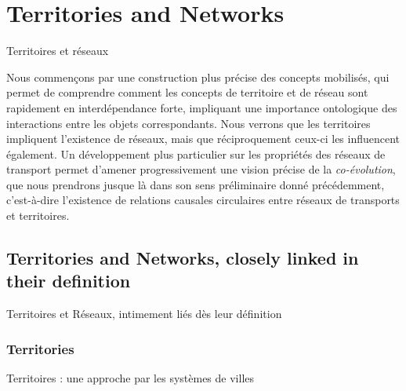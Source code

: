 


\newpage




\section{Territories and Networks}{Territoires et réseaux}

\label{sec:networkterritories}




Nous commençons par une construction plus précise des concepts mobilisés, qui permet de comprendre comment les concepts de territoire et de réseau sont rapidement en interdépendance forte, impliquant une importance ontologique des interactions entre les objets correspondants. Nous verrons que les territoires impliquent l'existence de réseaux, mais que réciproquement ceux-ci les influencent également. Un développement plus particulier sur les propriétés des réseaux de transport permet d'amener progressivement une vision précise de la \emph{co-évolution}, que nous prendrons jusque là dans son sens préliminaire donné précédemment, c'est-à-dire l'existence de relations causales circulaires entre réseaux de transports et territoires.




\subsection{Territories and Networks, closely linked in their definition}{Territoires et Réseaux, intimement liés dès leur définition}



\subsubsection{Territories}{Territoires : une approche par les systèmes de villes}


